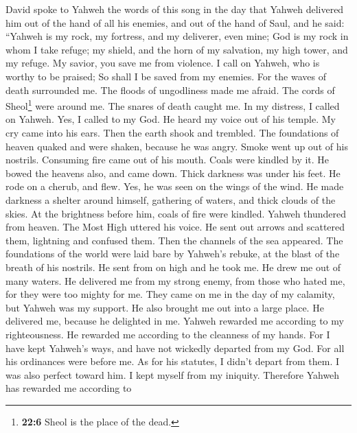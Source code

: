 David spoke to Yahweh the words of this song in the day
that Yahweh delivered him out of the hand of all his enemies, and out of
the hand of Saul,  and he said: ``Yahweh is my rock, my
fortress, and my deliverer, even mine;  God is my rock in
whom I take refuge; my shield, and the horn of my salvation, my high
tower, and my refuge. My savior, you save me from violence.
 I call on Yahweh, who is worthy to be praised; So shall I
be saved from my enemies.  For the waves of death
surrounded me. The floods of ungodliness made me afraid. 
The cords of Sheol\footnote{\textbf{22:6} Sheol is the place of the
  dead.} were around me. The snares of death caught me. 
In my distress, I called on Yahweh. Yes, I called to my God. He heard my
voice out of his temple. My cry came into his ears.  Then
the earth shook and trembled. The foundations of heaven quaked and were
shaken, because he was angry.  Smoke went up out of his
nostrils. Consuming fire came out of his mouth. Coals were kindled by
it.  He bowed the heavens also, and came down. Thick
darkness was under his feet.  He rode on a cherub, and
flew. Yes, he was seen on the wings of the wind.  He made
darkness a shelter around himself, gathering of waters, and thick clouds
of the skies.  At the brightness before him, coals of
fire were kindled.  Yahweh thundered from heaven. The
Most High uttered his voice.  He sent out arrows and
scattered them, lightning and confused them.  Then the
channels of the sea appeared. The foundations of the world were laid
bare by Yahweh's rebuke, at the blast of the breath of his nostrils.
 He sent from on high and he took me. He drew me out of
many waters.  He delivered me from my strong enemy, from
those who hated me, for they were too mighty for me. 
They came on me in the day of my calamity, but Yahweh was my support.
 He also brought me out into a large place. He delivered
me, because he delighted in me.  Yahweh rewarded me
according to my righteousness. He rewarded me according to the cleanness
of my hands.  For I have kept Yahweh's ways, and have not
wickedly departed from my God.  For all his ordinances
were before me. As for his statutes, I didn't depart from them.
 I was also perfect toward him. I kept myself from my
iniquity.  Therefore Yahweh has rewarded me according to
